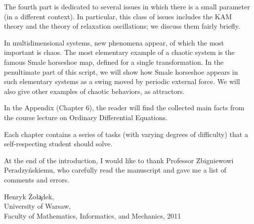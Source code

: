 The fourth part is dedicated to several issues in which there is a small parameter (in a different context). In particular, this class of issues includes the KAM theory and the theory of relaxation oscillations; we discuss them fairly briefly.

In multidimensional systems, new phenomena appear, of which the most important is chaos. The most elementary example of a chaotic system is the famous Smale horseshoe map, defined for a single transformation. In the penultimate part of this script, we will show how Smale horseshoe appears in such elementary systems as a swing moved by periodic external force. We will also give other examples of chaotic behaviors, as attractors.

In the Appendix (Chapter 6), the reader will find the collected main facts from the course lecture on Ordinary Differential Equations.

Each chapter contains a series of tasks (with varying degrees of difficulty) that a self-respecting student should solve.

At the end of the introduction, I would like to thank Professor Zbigniewowi Peradzyńskiemu, who carefully read the manuscript and gave me a list of comments and errors.\\

\begin{flushright}
	Henryk Żoł\c{a}dek,\\
	University of Warsaw,\\
	Faculty of Mathematics, Informatics, and Mechanics, 2011	
\end{flushright}